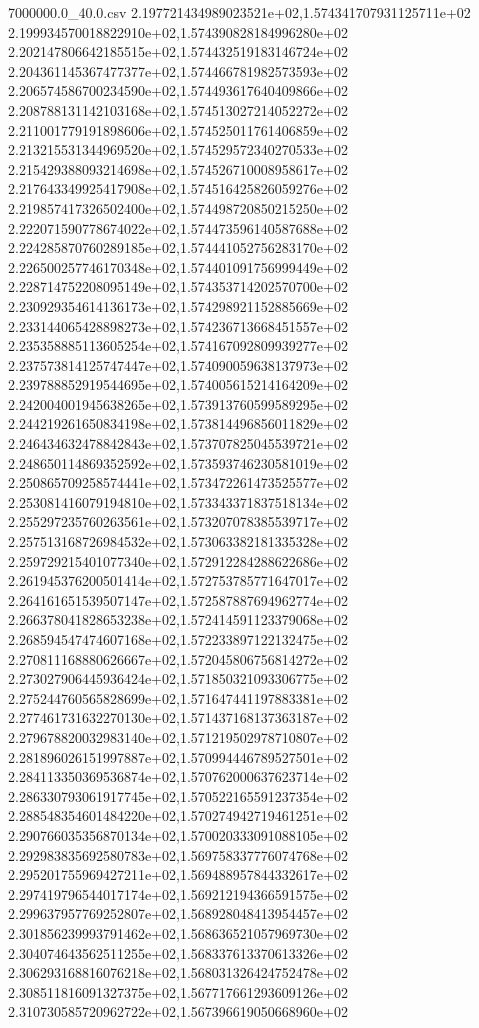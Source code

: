 \begin{filecontents*}{7000000.0_40.0.csv}
2.197721434989023521e+02,1.574341707931125711e+02
2.199934570018822910e+02,1.574390828184996280e+02
2.202147806642185515e+02,1.574432519183146724e+02
2.204361145367477377e+02,1.574466781982573593e+02
2.206574586700234590e+02,1.574493617640409866e+02
2.208788131142103168e+02,1.574513027214052272e+02
2.211001779191898606e+02,1.574525011761406859e+02
2.213215531344969520e+02,1.574529572340270533e+02
2.215429388093214698e+02,1.574526710008958617e+02
2.217643349925417908e+02,1.574516425826059276e+02
2.219857417326502400e+02,1.574498720850215250e+02
2.222071590778674022e+02,1.574473596140587688e+02
2.224285870760289185e+02,1.574441052756283170e+02
2.226500257746170348e+02,1.574401091756999449e+02
2.228714752208095149e+02,1.574353714202570700e+02
2.230929354614136173e+02,1.574298921152885669e+02
2.233144065428898273e+02,1.574236713668451557e+02
2.235358885113605254e+02,1.574167092809939277e+02
2.237573814125747447e+02,1.574090059638137973e+02
2.239788852919544695e+02,1.574005615214164209e+02
2.242004001945638265e+02,1.573913760599589295e+02
2.244219261650834198e+02,1.573814496856011829e+02
2.246434632478842843e+02,1.573707825045539721e+02
2.248650114869352592e+02,1.573593746230581019e+02
2.250865709258574441e+02,1.573472261473525577e+02
2.253081416079194810e+02,1.573343371837518134e+02
2.255297235760263561e+02,1.573207078385539717e+02
2.257513168726984532e+02,1.573063382181335328e+02
2.259729215401077340e+02,1.572912284288622686e+02
2.261945376200501414e+02,1.572753785771647017e+02
2.264161651539507147e+02,1.572587887694962774e+02
2.266378041828653238e+02,1.572414591123379068e+02
2.268594547474607168e+02,1.572233897122132475e+02
2.270811168880626667e+02,1.572045806756814272e+02
2.273027906445936424e+02,1.571850321093306775e+02
2.275244760565828699e+02,1.571647441197883381e+02
2.277461731632270130e+02,1.571437168137363187e+02
2.279678820032983140e+02,1.571219502978710807e+02
2.281896026151997887e+02,1.570994446789527501e+02
2.284113350369536874e+02,1.570762000637623714e+02
2.286330793061917745e+02,1.570522165591237354e+02
2.288548354601484220e+02,1.570274942719461251e+02
2.290766035356870134e+02,1.570020333091088105e+02
2.292983835692580783e+02,1.569758337776074768e+02
2.295201755969427211e+02,1.569488957844332617e+02
2.297419796544017174e+02,1.569212194366591575e+02
2.299637957769252807e+02,1.568928048413954457e+02
2.301856239993791462e+02,1.568636521057969730e+02
2.304074643562511255e+02,1.568337613370613326e+02
2.306293168816076218e+02,1.568031326424752478e+02
2.308511816091327375e+02,1.567717661293609126e+02
2.310730585720962722e+02,1.567396619050668960e+02

\end{filecontents*}
